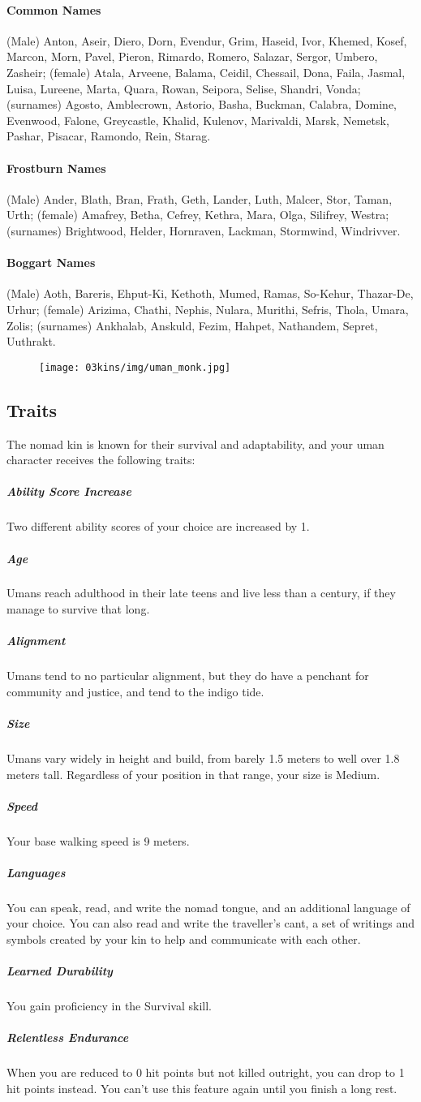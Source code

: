 \begin{linenumbers}
\paragraph{Common Names}
(Male) Anton, Aseir, Diero, Dorn, Evendur, Grim, Haseid, Ivor, Khemed, Kosef, Marcon, Morn, Pavel, Pieron, Rimardo, Romero, Salazar, Sergor, Umbero, Zasheir;
(female) Atala, Arveene, Balama, Ceidil, Chessail, Dona, Faila, Jasmal, Luisa, Lureene, Marta, Quara, Rowan, Seipora, Selise, Shandri, Vonda;
(surnames) Agosto, Amblecrown, Astorio, Basha, Buckman, Calabra, Domine, Evenwood, Falone, Greycastle, Khalid, Kulenov, Marivaldi, Marsk, Nemetsk, Pashar, Pisacar, Ramondo, Rein, Starag.

\paragraph{Frostburn Names}
(Male) Ander, Blath, Bran, Frath, Geth, Lander, Luth, Malcer, Stor, Taman, Urth;
(female) Amafrey, Betha, Cefrey, Kethra, Mara, Olga, Silifrey, Westra;
(surnames) Brightwood, Helder, Hornraven, Lackman, Stormwind, Windrivver.

\paragraph{Boggart Names}
(Male) Aoth, Bareris, Ehput-Ki, Kethoth, Mumed, Ramas, So-Kehur, Thazar-De, Urhur;
(female) Arizima, Chathi, Nephis, Nulara, Murithi, Sefris, Thola, Umara, Zolis;
(surnames) Ankhalab, Anskuld, Fezim, Hahpet, Nathandem, Sepret, Uuthrakt.

\begin{figure}[!b]
    \centering
    \texttt{[image: 03kins/img/uman\_monk.jpg]}
\end{figure}

\subsection*{Traits}
The nomad kin is known for their survival and adaptability, and your uman character receives the following traits:
\subparagraph{Ability Score Increase} Two different ability scores of your choice are increased by 1.
\subparagraph{Age} Umans reach adulthood in their late teens and live less than a century, if they manage to survive that long.
\subparagraph{Alignment} Umans tend to no particular alignment, but they do have a penchant for community and justice, and tend to the indigo tide.
\subparagraph{Size} Umans vary widely in height and build, from barely 1.5 meters to well over 1.8 meters tall.
Regardless of your position in that range, your size is Medium.
\subparagraph{Speed} Your base walking speed is 9 meters.
\subparagraph{Languages} You can speak, read, and write the nomad tongue, and an additional language of your choice.
You can also read and write the traveller's cant, a set of writings and symbols created by your kin to help and communicate with each other.
\subparagraph{Learned Durability} You gain proficiency in the Survival skill.
\subparagraph{Relentless Endurance} When you are reduced to 0 hit points but not killed outright, you can drop to 1 hit points instead.
You can't use this feature again until you finish a long rest.


\end{linenumbers}
